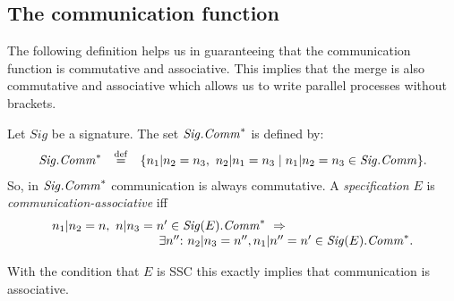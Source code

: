 \documentclass[twoside,fleqn,a4paper,dvips]{article}
\newcommand{\Sig}{\nm{Sig}}
\newcommand{\wor}{\stackrel{\mathrm{def}}{=}}
\begin{document}
\subsection{The communication function}
The following definition helps us in guaranteeing that the
communication function is commutative and associative. This implies
that the merge is also commutative and associative which allows us to
write parallel processes without brackets. 
\begin{defn}
Let $Sig$ be a signature. The set $\Sig.\Comm^*$ is defined by:
\[\begin{array}{rcl}
\Sig.\Comm^*&\wor&\{n_1| n_2=n_3,~ n_2| n_1=n_3 \mid
n_1| n_2=n_3\in \Sig.\Comm\}.
\end{array}\]
So, in $\Sig.\Comm^*$ communication is always commutative. A
{\it specification} $E$ is {\it communication-associative} iff
\[
\begin{array}{l}
n_1| n_2= n,~ n| n_3=n'\in
\Sig(E).\Comm^*~\Rightarrow\\
\hspace*{3cm}\exists n''\ap ~n_2| n_3=n'',
n_1| n''= n' \in \Sig(E).\Comm^*.
\end{array}
\]
\end{defn}
With the condition that $E$ is SSC
this exactly implies that communication is associative.
\end{document}
